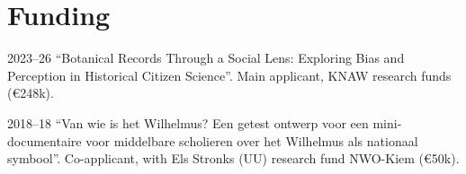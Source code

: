\documentclass[12pt,letterpaper]{report}
\begin{document}
\nocite{*}
\printbibliography[title=Publications, heading=subbibliography]

\section*{Funding}
\begin{tablist}
  \item[2023--26] \tab{}``Botanical Records Through a Social Lens: Exploring Bias
    and Perception in Historical Citizen Science''. Main applicant, KNAW research
    funds (€248k). 
  \item[2018--18] \tab{}``Van wie is het Wilhelmus? Een getest ontwerp voor een
    mini-documentaire voor middelbare scholieren over het Wilhelmus als
    nationaal symbool''. Co-applicant, with Els Stronks (UU) research fund
    NWO-Kiem (€50k).
\end{tablist}
\end{document}
